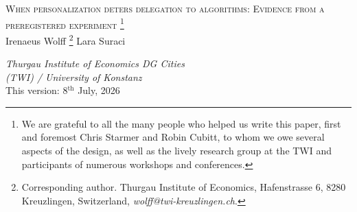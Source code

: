 \documentclass[a4paper, 12pt, fleqn]{article}
\title{\mytitle}
\date{}
\theoremstyle{definition}
\newcommand{\symbolfootnote}[1]{\begingroup%
\renewcommand{\thefootnote}{\fnsymbol{footnote}}\footnote{#1}\endgroup}
\newcommand{\mytitle}{{\Large \textsc{When personalization deters delegation to algorithms: Evidence from a preregistered experiment}}}
\begin{document}
 
\thispagestyle{empty}
\begin{center}
	\mytitle\symbolfootnote{We are grateful to all the many people who helped us write this paper, first and foremost Chris Starmer and Robin Cubitt, to whom we owe several aspects of the design, as well as the lively research group at the TWI and participants of numerous workshops and conferences.}
  \vspace{.55cm}\\
 Irenaeus Wolff\symbolfootnote{Corresponding author. Thurgau Institute of Economics, Hafenstrasse 6, 8280 Kreuzlingen, Switzerland, \textit{wolff@twi-kreuzlingen.ch}.} \qquad\qquad\qquad Lara Suraci
\\\vspace{.25cm}
 \begin{small}
  \textit{Thurgau Institute of Economics\phantom{text} \qquad\qquad DG Cities\phantom{moretext} \\ (TWI) / University of Konstanz \qquad\qquad \phantom{moretext University} } %
  \vspace{.03cm}\\
 {This version: 8$^{\text{th}}$ July, 2026}
\vspace{.6cm}
\end{small}
\end{center}
\end{document}
